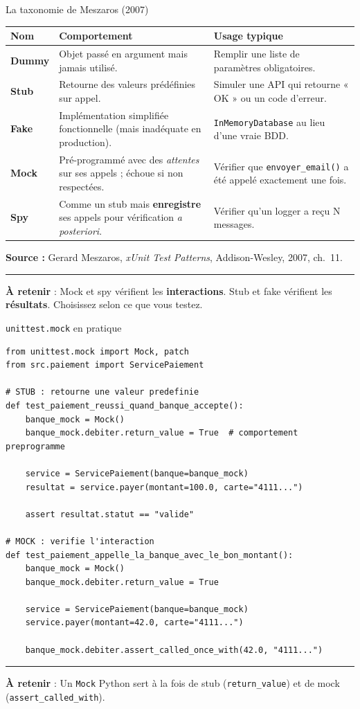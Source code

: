 \documentclass[aspectratio=169,11pt]{beamer}
\newcommand{\takeaway}[1]{%
\vfill\begin{beamercolorbox}[wd=\linewidth,sep=0.4em]{}
\color{accent2}\rule[0.6ex]{1.2em}{1.2pt}\hspace{0.4em}%
\textbf{\color{accent2}\small À retenir} \textcolor{textsoft}{:} %
{\small\color{textmain}#1}
\end{beamercolorbox}}
\begin{document}
\begin{frame}[t,shrink=10]{La taxonomie de Meszaros (2007)}
\footnotesize
\begin{tabular}{@{}p{2.0cm} p{4.5cm} p{6.0cm}@{}}
\toprule
\textbf{Nom} & \textbf{Comportement} & \textbf{Usage typique} \\
\midrule
\textbf{Dummy} & 
Objet passé en argument mais jamais utilisé. & 
Remplir une liste de paramètres obligatoires. \\
\addlinespace[0.15em]
\textbf{Stub} & 
Retourne des valeurs prédéfinies sur appel. & 
Simuler une API qui retourne « OK » ou un code d'erreur. \\
\addlinespace[0.15em]
\textbf{Fake} & 
Implémentation simplifiée fonctionnelle (mais inadéquate en production). & 
\texttt{InMemoryDatabase} au lieu d'une vraie BDD. \\
\addlinespace[0.15em]
\textbf{Mock} & 
Pré-programmé avec des \emph{attentes} sur ses appels ; échoue si non respectées. & 
Vérifier que \texttt{envoyer\_email()} a été appelé exactement une fois. \\
\addlinespace[0.15em]
\textbf{Spy} & 
Comme un stub mais \textbf{enregistre} ses appels pour vérification \emph{a posteriori}. & 
Vérifier qu'un logger a reçu N messages. \\
\bottomrule
\end{tabular}
\vspace{0.3cm}
\textbf{Source :} Gerard Meszaros, \emph{xUnit Test Patterns}, Addison-Wesley, 2007, ch.~11.
\takeaway{Mock et spy vérifient les \textbf{interactions}. Stub et fake vérifient les \textbf{résultats}. Choisissez selon ce que vous testez.}
\end{frame}

\begin{frame}[fragile,t,shrink=15]{\texttt{unittest.mock} en pratique}
\begin{lstlisting}[style=pythondark]
from unittest.mock import Mock, patch
from src.paiement import ServicePaiement

# STUB : retourne une valeur predefinie
def test_paiement_reussi_quand_banque_accepte():
    banque_mock = Mock()
    banque_mock.debiter.return_value = True  # comportement preprogramme

    service = ServicePaiement(banque=banque_mock)
    resultat = service.payer(montant=100.0, carte="4111...")

    assert resultat.statut == "valide"

# MOCK : verifie l'interaction
def test_paiement_appelle_la_banque_avec_le_bon_montant():
    banque_mock = Mock()
    banque_mock.debiter.return_value = True

    service = ServicePaiement(banque=banque_mock)
    service.payer(montant=42.0, carte="4111...")

    banque_mock.debiter.assert_called_once_with(42.0, "4111...")
\end{lstlisting}
\takeaway{Un \texttt{Mock} Python sert à la fois de stub (\texttt{return\_value}) et de mock (\texttt{assert\_called\_with}).}
\end{frame}
\end{document}
